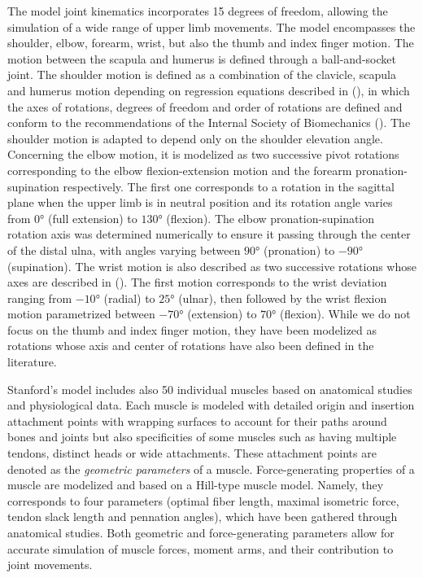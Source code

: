 The model joint kinematics incorporates 15 degrees of freedom, allowing the simulation of a wide range of upper limb movements. The model encompasses the shoulder, elbow, forearm, wrist, but also the thumb and index finger motion. The motion between the scapula and humerus is defined through a ball-and-socket joint. The shoulder motion is defined as a combination of the clavicle, scapula and humerus motion depending on regression equations described in (\cite{degrootThreedimensionalRegressionModel2001}), in which the axes of rotations, degrees of freedom and order of rotations are defined and conform to the recommendations of the Internal Society of Biomechanics (\cite{wuISBRecommendationDefinitions2005}). The shoulder motion is adapted to depend only on the shoulder elevation angle. Concerning the elbow motion, it is modelized as two successive pivot rotations corresponding to the elbow flexion-extension motion and the forearm pronation-supination respectively. The first one corresponds to a rotation in the sagittal plane when the upper limb is in neutral position and its rotation angle varies from $0$° (full extension) to $130$° (flexion). The elbow pronation-supination rotation axis was determined numerically to ensure it passing through the center of the distal ulna, with angles varying between $90$° (pronation) to $-90$° (supination).
The wrist motion is also described as two successive rotations whose axes are described in (\cite{rubyRelativeMotionSelected1988}). The first motion corresponds to the wrist deviation ranging from $-10$° (radial) to $25$° (ulnar), then followed by the wrist flexion motion parametrized between $-70$° (extension) to $70$° (flexion). While we do not focus on the thumb and index finger motion, they have been modelized as rotations whose axis and center of rotations have also been defined in the literature.


Stanford's model includes also 50 individual muscles based on anatomical studies and physiological data. Each muscle is modeled with detailed origin and insertion attachment points with wrapping surfaces to account for their paths around bones and joints but also specificities of some muscles such as having multiple tendons, distinct heads or wide attachments. These attachment points are denoted as the \emph{geometric parameters} of a muscle. Force-generating properties of a muscle are modelized and based on a Hill-type muscle model. Namely, they corresponds to four parameters (optimal fiber length, maximal isometric force, tendon slack length and pennation angles), which have been gathered through anatomical studies. Both geometric and force-generating parameters allow for accurate simulation of muscle forces, moment arms, and their contribution to joint movements.

